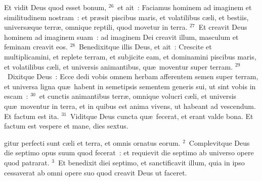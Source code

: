  Et vidit Deus quod esset bonum,
${}^{26}$~et ait~: Faciamus hominem ad imaginem et similitudinem nostram~: et pr\ae sit piscibus maris, et volatilibus c\ae li, et bestiis, univers\ae que terr\ae , omnique reptili, quod movetur in terra.
${}^{27}$~Et creavit Deus hominem ad imaginem suam~: ad imaginem Dei creavit illum, masculum et feminam creavit eos.
${}^{28}$~Benedixitque illis Deus, et ait~: Crescite et multiplicamini, et replete terram, et subjicite eam, et dominamini piscibus maris, et volatilibus c\ae li, et universis animantibus, qu\ae\ moventur super terram.
${}^{29}$~Dixitque Deus~: Ecce dedi vobis omnem herbam afferentem semen super terram, et universa ligna qu\ae\ habent in semetipsis sementem generis sui, ut sint vobis in escam~:
${}^{30}$~et cunctis animantibus terr\ae , omnique volucri c\ae li, et universis qu\ae\ moventur in terra, et in quibus est anima vivens, ut habeant ad vescendum. Et factum est ita.
${}^{31}$~Viditque Deus cuncta qu\ae\ fecerat, et erant valde bona. Et factum est vespere et mane, dies sextus.

\bchapter
{}gitur perfecti sunt c\ae li et terra, et omnis ornatus eorum.
${}^{2}$~Complevitque Deus die septimo opus suum quod fecerat~: et requievit die septimo ab universo opere quod patrarat.
${}^{3}$~Et benedixit diei septimo, et sanctificavit illum, quia in ipso cessaverat ab omni opere suo quod creavit Deus ut faceret.


